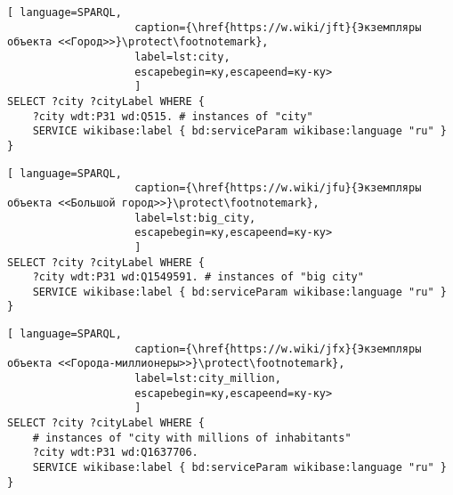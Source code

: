 
\begin{lstlisting}[ language=SPARQL, 
                    caption={\href{https://w.wiki/jft}{Экземпляры объекта <<Город>>}\protect\footnotemark},
                    label=lst:city, 
                    escapebegin=ку,escapeend=ку-ку>
                    ]
SELECT ?city ?cityLabel WHERE {
	?city wdt:P31 wd:Q515. # instances of "city"
	SERVICE wikibase:label { bd:serviceParam wikibase:language "ru" }
}
\end{lstlisting}


\begin{lstlisting}[ language=SPARQL, 
                    caption={\href{https://w.wiki/jfu}{Экземпляры объекта <<Большой город>>}\protect\footnotemark},
                    label=lst:big_city, 
                    escapebegin=ку,escapeend=ку-ку>
                    ]
SELECT ?city ?cityLabel WHERE {
	?city wdt:P31 wd:Q1549591. # instances of "big city"    
	SERVICE wikibase:label { bd:serviceParam wikibase:language "ru" }
}
\end{lstlisting}

\begin{lstlisting}[ language=SPARQL, 
                    caption={\href{https://w.wiki/jfx}{Экземпляры объекта <<Города-миллионеры>>}\protect\footnotemark},
                    label=lst:city_million, 
                    escapebegin=ку,escapeend=ку-ку>
                    ]
SELECT ?city ?cityLabel WHERE {
	# instances of "city with millions of inhabitants" 
	?city wdt:P31 wd:Q1637706.
	SERVICE wikibase:label { bd:serviceParam wikibase:language "ru" }
}
\end{lstlisting}

